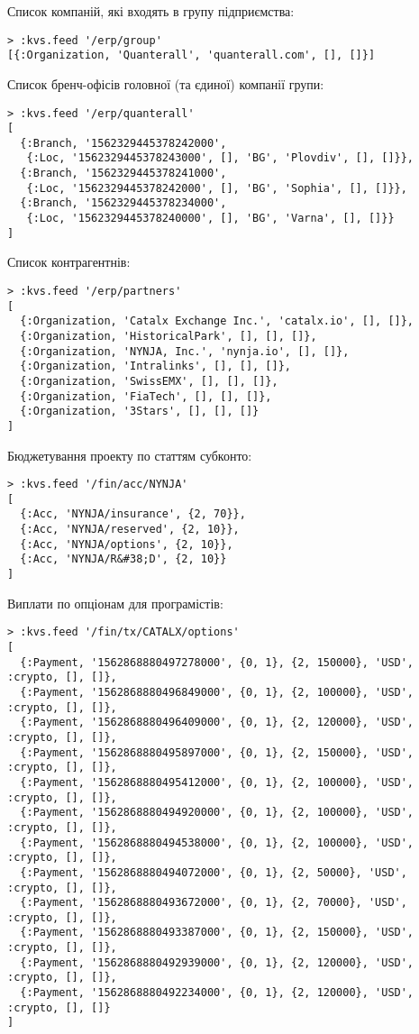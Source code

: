         Список компаній, які входять в групу підприємства:

   \begin{lstlisting}
> :kvs.feed '/erp/group'
[{:Organization, 'Quanterall', 'quanterall.com', [], []}]
    \end{lstlisting}

        Список бренч-офісів головної (та єдиної) компанії групи:

   \begin{lstlisting}
> :kvs.feed '/erp/quanterall'
[
  {:Branch, '1562329445378242000',
   {:Loc, '1562329445378243000', [], 'BG', 'Plovdiv', [], []}},
  {:Branch, '1562329445378241000',
   {:Loc, '1562329445378242000', [], 'BG', 'Sophia', [], []}},
  {:Branch, '1562329445378234000',
   {:Loc, '1562329445378240000', [], 'BG', 'Varna', [], []}}
]
    \end{lstlisting}

        Список контрагентнів:

   \begin{lstlisting}
> :kvs.feed '/erp/partners'
[
  {:Organization, 'Catalx Exchange Inc.', 'catalx.io', [], []},
  {:Organization, 'HistoricalPark', [], [], []},
  {:Organization, 'NYNJA, Inc.', 'nynja.io', [], []},
  {:Organization, 'Intralinks', [], [], []},
  {:Organization, 'SwissEMX', [], [], []},
  {:Organization, 'FiaTech', [], [], []},
  {:Organization, '3Stars', [], [], []}
]
    \end{lstlisting}

    Бюджетування проекту по статтям субконто:

   \begin{lstlisting}
> :kvs.feed '/fin/acc/NYNJA'
[
  {:Acc, 'NYNJA/insurance', {2, 70}},
  {:Acc, 'NYNJA/reserved', {2, 10}},
  {:Acc, 'NYNJA/options', {2, 10}},
  {:Acc, 'NYNJA/R&#38;D', {2, 10}}
]
    \end{lstlisting}

    Виплати по опціонам для програмістів:

   \begin{lstlisting}
> :kvs.feed '/fin/tx/CATALX/options'
[
  {:Payment, '1562868880497278000', {0, 1}, {2, 150000}, 'USD', :crypto, [], []},
  {:Payment, '1562868880496849000', {0, 1}, {2, 100000}, 'USD', :crypto, [], []},
  {:Payment, '1562868880496409000', {0, 1}, {2, 120000}, 'USD', :crypto, [], []},
  {:Payment, '1562868880495897000', {0, 1}, {2, 150000}, 'USD', :crypto, [], []},
  {:Payment, '1562868880495412000', {0, 1}, {2, 100000}, 'USD', :crypto, [], []},
  {:Payment, '1562868880494920000', {0, 1}, {2, 100000}, 'USD', :crypto, [], []},
  {:Payment, '1562868880494538000', {0, 1}, {2, 100000}, 'USD', :crypto, [], []},
  {:Payment, '1562868880494072000', {0, 1}, {2, 50000}, 'USD', :crypto, [], []},
  {:Payment, '1562868880493672000', {0, 1}, {2, 70000}, 'USD', :crypto, [], []},
  {:Payment, '1562868880493387000', {0, 1}, {2, 150000}, 'USD', :crypto, [], []},
  {:Payment, '1562868880492939000', {0, 1}, {2, 120000}, 'USD', :crypto, [], []},
  {:Payment, '1562868880492234000', {0, 1}, {2, 120000}, 'USD', :crypto, [], []}
]
    \end{lstlisting}

